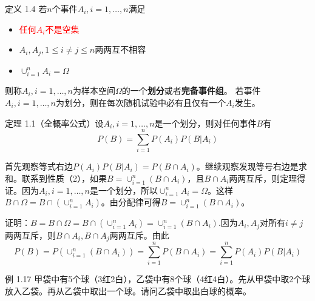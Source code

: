 \documentclass{beamer}
\newcommand{\new}[1]{\textcolor{red}{#1}}
\begin{document}
	\begin{frame}
		定义 1.4 若$n$个事件$A_i, i = 1, \dots, n$满足
		\begin{itemize}
			\item \new{任何$A_i$不是空集}
			\item $A_i, A_j, 1 \leq i \neq j \leq n$两两互不相容
			\item $\cup_{i = 1}^nA_i = \Omega$
		\end{itemize}
		则称$A_i, i = 1, \dots, n$为样本空间$\Omega$的一个\textbf{划分}或者\textbf{完备事件组}。
		若事件$A_i, i = 1, \dots, n$为划分，则在每次随机试验中必有且仅有一个$A_i$发生。
		
		定理 1.1（全概率公式）设$A_i, i = 1, \dots, n$是一个划分，则对任何事件$B$有
		\[
		P(B) = \sum_{i = 1}^{n}P(A_i)P(B | A_i)
		\]
	\end{frame}
	\begin{frame}
		首先观察等式右边$P(A_i)P(B | A_i) = P(B \cap A_i)$。继续观察发现等号右边是求和。联系到性质（2），如果$B = \cup_{i = 1}^n (B \cap A_i)$，且$B \cap A_i$两两互斥，则定理得证。因为$A_i, i = 1, \dots, n$是一个划分，所以$\cup_{i = 1}^nA_i = \Omega$。这样$B \cap \Omega = B \cap (\cup_{i = 1}^{n}A_i)$。由分配律可得$B = \cup_{i = 1}^n (B \cap A_i)$。
		
		\vspace*{1cm}
		证明：$B = B \cap \Omega = B\cap (\cup_{i = 1}^{n}A_i) = \cup_{i = 1}^n (B \cap A_i)$.因为$A_i, A_j$对所有$i \neq j$两两互斥，则$B \cap A_i, B \cap A_j$两两互斥。由此
		\[
		P(B) = P(\cup_{i = 1}^n (B \cap A_i)) = \sum_{i = 1}^{n} P(B \cap A_i) = \sum_{i = 1}^{n}P(A_i)P(B | A_i) 
		\]
	\end{frame}
	
	\begin{frame}
		例 1.17 甲袋中有5个球（3红2白），乙袋中有8个球（4红4白）。先从甲袋中取2个球放入乙袋。再从乙袋中取出一个球。请问乙袋中取出白球的概率。
		
	\end{frame}
	
\end{document}
